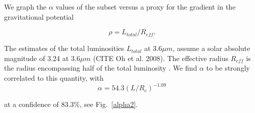 \documentclass[reprint,%
 amsmath,amssymb,
 aps,
]{revtex4-1}
\begin{document}
 


  We graph the  $\alpha$ values of the subset versus a proxy for the gradient in the gravitational potential
  
   \begin{equation}
     \rho = L_{total}/R_{eff}.
 \end{equation}
 
 The  estimates of the  total luminosities $L_{total}$ at $3.6 \mu m$,  assume a solar
absolute magnitude of 3.24 at $3.6 \mu m$ (CITE Oh et al. 2008). The effective radius $R_{eff}$ is    the radius encompassing half of the total luminosity \citet{2016Lelli}.  We find $\alpha$  to be   strongly correlated to  this quantity, with 
\begin{equation}
    \alpha = 54.3 (L/R_e)^{-1.09}
\end{equation}

at a confidence of $83.3\%$, see Fig.~\ref{alpha2}.
  
\end{document}
